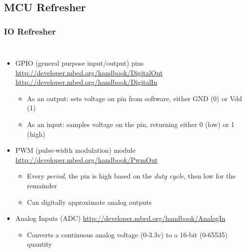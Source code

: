 \documentclass{beamer}
\begin{document}
\subsection{MCU Refresher}
\begin{frame}
\frametitle{IO Refresher}
\begin{columns}[t]
\begin{itemize}
  \item GPIO (general purpose input/output) pins
  {\tiny\url{http://developer.mbed.org/handbook/DigitalOut}
    \url{http://developer.mbed.org/handbook/DigitalIn}}
  \begin{itemize}
    \item As an output: sets voltage on pin from software, either GND (0) or Vdd (1)
    \item As an input: samples voltage on the pin, returning either 0 (low) or 1 (high)
  \end{itemize}
  \item PWM (pulse-width modulation) module
  {\tiny\url{http://developer.mbed.org/handbook/PwmOut}}
  \begin{itemize}
    \item Every \textit{period}, the pin is high based on the \textit{duty cycle}, then low for the remainder
    \item Can digitally approximate analog outputs
  \end{itemize}
  \item Analog Inputs (ADC)
  {\tiny\url{http://developer.mbed.org/handbook/AnalogIn}}
  \begin{itemize}
    \item Converts a continuous analog voltage (0-3.3v) to a 16-bit (0-65535) quantity
  \end{itemize}
\end{itemize}


\end{columns}
\end{frame}
\end{document}
